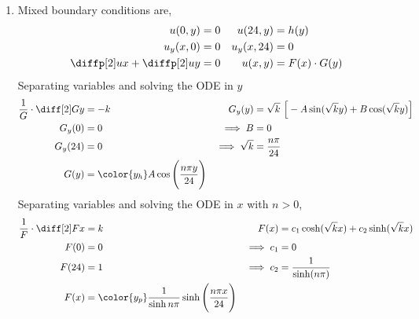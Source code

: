 \begin{enumerate}
    \item Mixed boundary conditions are,
          \begin{align}
              u(0, y)                    & = 0               &
              u(24, y)                   & = h(y)              \\
              u_y(x, 0)                  & = 0               &
              u_y(x, 24)                 & = 0                 \\
              \diffp[2] ux +\diffp[2] uy & = 0               &
              u(x, y)                    & = F(x) \cdot G(y)
          \end{align}
          Separating variables and solving the ODE in $ y $
          \begin{align}
              \frac{1}{G} \cdot \diff[2] Gy & = -k                                &
              G_y(y)                        & = \sqrt{k}\ \Big[ -A\sin(\sqrt{k}y)
              + B\cos(\sqrt{k}y) \Big]                                              \\
              G_y(0)                        & = 0                                 &
              \implies B                    & = 0                                   \\
              G_y(24)                       & = 0                                 &
              \implies \sqrt{k}             & = \frac{n\pi}{24}                     \\
              G(y)                          & = \color{y_h} A\cos\Bigg(
              \frac{n\pi y}{24} \Bigg)
          \end{align}
          Separating variables and solving the ODE in $ x $ with $ n > 0 $,
          \begin{align}
              \frac{1}{F} \cdot \diff[2] Fx & = k                                 &
              F(x)                          & = c_1 \cosh(\sqrt{k}x)
              + c_2\sinh(\sqrt{k}x)                                                 \\
              F(0)                          & = 0                                 &
              \implies c_1                  & = 0                                   \\
              F(24)                         & = 1                                 &
              \implies c_2                  & = \frac{1}{\sinh(n\pi)}               \\
              F(x)                          & = \color{y_p} \frac{1}{\sinh{n\pi}}
              \sinh\Bigg(
              \frac{n\pi x}{24}\Bigg)
          \end{align}


\end{enumerate}
